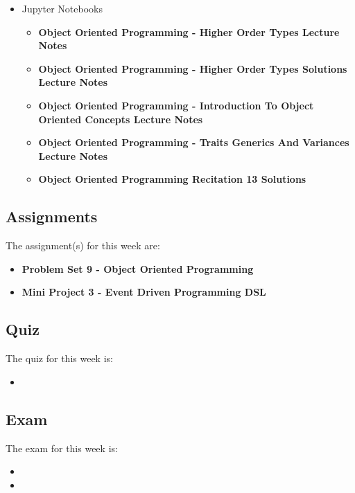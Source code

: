 \begin{itemize}
    \item Jupyter Notebooks
    \begin{itemize}
        \item \textbf{Object Oriented Programming - Higher Order Types Lecture Notes}
        \item \textbf{Object Oriented Programming - Higher Order Types Solutions Lecture Notes}
        \item \textbf{Object Oriented Programming - Introduction To Object Oriented Concepts Lecture Notes}
        \item \textbf{Object Oriented Programming - Traits Generics And Variances Lecture Notes}
        \item \textbf{Object Oriented Programming Recitation 13 Solutions}
    \end{itemize}
\end{itemize}

\subsection{Assignments}

The assignment(s) for this week are:

\begin{itemize}
    \item \textbf{Problem Set 9 - Object Oriented Programming}
    \item \textbf{Mini Project 3 - Event Driven Programming DSL}
\end{itemize}

\subsection{Quiz}

The quiz for this week is:

\begin{itemize}
    \item {}
\end{itemize}

\subsection{Exam}

The exam for this week is:

\begin{itemize}
    \item {}
    \item {}
\end{itemize}

